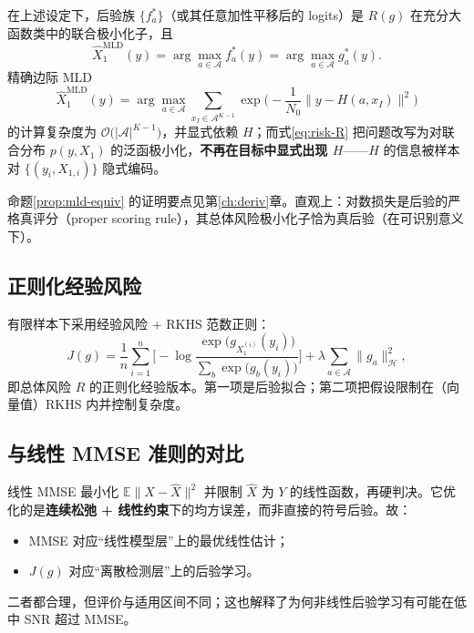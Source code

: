 \begin{proposition}[问题等价性]
\label{prop:mld-equiv}
在上述设定下，后验族 $\{f_a^*\}$（或其任意加性平移后的 logits）是 $R(g)$ 在充分大函数类中的联合极小化子，且
\begin{equation}
\hat X_1^{\mathrm{MLD}}(y)
=\arg\max_{a\in\mathcal{A}} f_a^*(y)
=\arg\max_{a\in\mathcal{A}} g_a^*(y).
\end{equation}
精确边际 MLD
\begin{equation}
\hat X_1^{\mathrm{MLD}}(y)
=\arg\max_{a\in\mathcal{A}}
\sum_{x_I\in\mathcal{A}^{K-1}}
\exp\Big(-\frac{1}{N_0}\big\|y-H(a,x_I)\big\|^2\Big)
\end{equation}
的计算复杂度为 $\mathcal{O}\big(|\mathcal{A}|^{K-1}\big)$，并显式依赖 $H$；而式\eqref{eq:risk-R} 把问题改写为对联合分布 $p(y,X_1)$ 的泛函极小化，\textbf{不再在目标中显式出现 $H$}——$H$ 的信息被样本对 $\{(y_i,X_{1,i})\}$ 隐式编码。
\end{proposition}

命题\ref{prop:mld-equiv} 的证明要点见第\ref{ch:deriv}章。直观上：对数损失是后验的严格真评分（proper scoring rule），其总体风险极小化子恰为真后验（在可识别意义下）。

\subsection{正则化经验风险}
有限样本下采用经验风险 + RKHS 范数正则：
\begin{equation}
J(g)=\frac1n\sum_{i=1}^n
\Big[
-\log\frac{\exp\big(g_{X_1^{(i)}}(y_i)\big)}{\sum_b\exp\big(g_b(y_i)\big)}
\Big]
+\lambda\sum_{a\in\mathcal{A}}\|g_a\|_{\mathcal{H}}^2,
\label{eq:Jtheory}
\end{equation}
即总体风险 $R$ 的正则化经验版本。第一项是后验拟合；第二项把假设限制在（向量值）RKHS 内并控制复杂度。

\subsection{与线性 MMSE 准则的对比}
线性 MMSE 最小化 $\mathbb{E}\|X-\hat X\|^2$ 并限制 $\hat X$ 为 $Y$ 的线性函数，再硬判决。它优化的是\textbf{连续松弛 + 线性约束}下的均方误差，而非直接的符号后验。故：
\begin{itemize}[leftmargin=2em]
  \item MMSE 对应“线性模型层”上的最优线性估计；
  \item $J(g)$ 对应“离散检测层”上的后验学习。
\end{itemize}
二者都合理，但评价与适用区间不同；这也解释了为何非线性后验学习有可能在低中 SNR 超过 MMSE。

